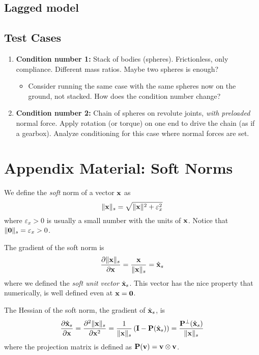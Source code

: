 \subsection{Lagged model}

\subsection{Test Cases}

\begin{enumerate}
    \item \textbf{Condition number 1:} Stack of bodies (spheres). Frictionless, only
    compliance. Different mass ratios. Maybe two spheres is enough? \begin{itemize}
        \item Consider running the same case with the same spheres now on the
        ground, not stacked. How does the condition number change?
    \end{itemize}
    \item \textbf{Condition number 2:} Chain of spheres on revolute joints, \textit{with
    preloaded} normal force. Apply rotation (or torque) on one end to drive the
    chain (as if a gearbox). Analyze conditioning for this case where normal
    forces are set.
\end{enumerate}

\section{Appendix Material: Soft Norms}
\label{sec:soft_norms}

We define the \emph{soft} norm of a vector ${\mathbf{x}}$ as
\begin{equation}
    \Vert\mf{x}\Vert_s = \sqrt{\Vert\mf{x}\Vert^2+\varepsilon_x^2}
    \label{eq:soft_norm_gradient}
\end{equation}
where $\varepsilon_x>0$ is usually a small number with the units of ${\mathbf{x}}$. Notice that $\Vert{\mathbf{0}}\Vert_s=\varepsilon_x > 0$.

The gradient of the soft norm is
\begin{equation}
    \frac{\partial\Vert\mf{x}\Vert_s}{\partial \mf{x}} = \frac{\mf{x}}{\Vert\mf{x}\Vert_s} = \hat{\mf{x}}_s
    \label{eq:soft_norm_hessian}
\end{equation}
where we defined the \emph{soft unit vector} $\hat{{\mathbf{x}}}_s$. This vector has the nice property that numerically, is well defined even at ${\mathbf{x}}={\mathbf{0}}$.

The Hessian of the soft norm, the gradient of $\hat{{\mathbf{x}}}_s$, is
\begin{equation}
    \frac{\partial\hat{{\mathbf{x}}}_s}{\partial{\mathbf{x}}}=\frac{\partial^2\Vert{\mathbf{x}}\Vert_s}{\partial{\mathbf{x}}^2}=\frac{1}{\Vert{\mathbf{x}}\Vert_s}\left({\mathbf{I}}-{\mathbf{P}}(\hat{{\mathbf{x}}}_s)\right)=\frac{{\mathbf{P}}^\perp(\hat{{\mathbf{x}}}_s)}{{\Vert{\mathbf{x}}\Vert_s}}
\end{equation}
where the projection matrix is defined as ${\mathbf{P}}({\mathbf{v}})={\mathbf{v}}\otimes{\mathbf{v}}$.

